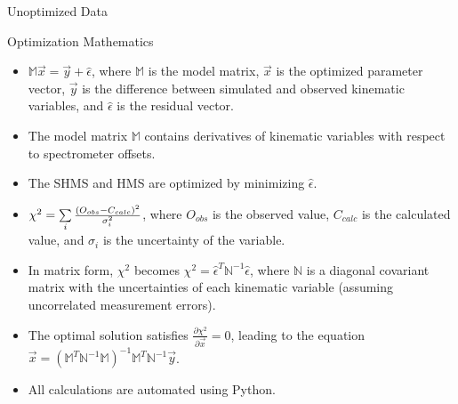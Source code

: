 \documentclass[final]{beamer}
\newlength{\colwidth}
\begin{document}
\begin{frame}[t]
\begin{columns}[t]
\begin{column}{\colwidth}
\begin{block}{Unoptimized Data}
\end{block}


\begin{exampleblock}{Optimization Mathematics}
\begin{itemize}
    \item $\mathbb{M}\vec{x}=\vec{y}+\hat\epsilon$, where $\mathbb{M}$ is the model matrix, $\vec{x}$ is the optimized parameter vector, $\vec{y}$ is the difference between simulated and observed kinematic variables, and $\hat\epsilon$ is the residual vector.
    \item The model matrix $\mathbb{M}$ contains derivatives of kinematic variables with respect to spectrometer offsets.
    \item  The SHMS and HMS are optimized by minimizing $\hat\epsilon$.
    \item $\scriptsize \chi^2=\sum\limits_{i}\frac{(O_{obs}-C_{calc})^2}{\sigma^2_i}$, where $O_{obs}$ is the observed value, $C_{calc}$ is the calculated value, and $\sigma_{i}$ is the uncertainty of the variable.
    \item In matrix form, $\chi^2$ becomes $\chi^2=\hat\epsilon^T\mathbb{N}^{-1}\hat\epsilon$, where $\mathbb{N}$ is a diagonal covariant matrix with the uncertainties of each kinematic variable (assuming uncorrelated measurement errors).
    \item The optimal solution satisfies $\frac{\partial \chi^2}{\partial \vec{x}}=0$, leading to the equation $ \vec{x}=(\mathbb{M}^T\mathbb{N}^{-1}\mathbb{M})^{-1}\mathbb{M}^T\mathbb{N}^{-1}\vec{y}$.
    \item All calculations are automated using Python.
\end{itemize}


\end{exampleblock}
\end{column}
\end{columns}
\end{frame}
\end{document}
